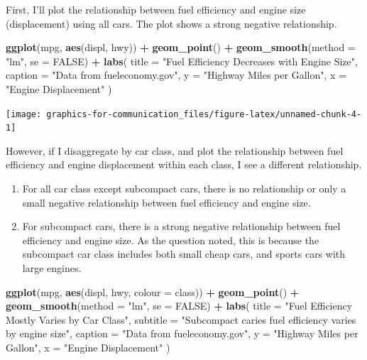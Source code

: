 \documentclass[]{book}
\newenvironment{Shaded}{\begin{snugshade}}{\end{snugshade}}
\newcommand{\DataTypeTok}[1]{\textcolor[rgb]{0.13,0.29,0.53}{#1}}
\newcommand{\KeywordTok}[1]{\textcolor[rgb]{0.13,0.29,0.53}{\textbf{#1}}}
\newcommand{\NormalTok}[1]{#1}
\newcommand{\OperatorTok}[1]{\textcolor[rgb]{0.81,0.36,0.00}{\textbf{#1}}}
\newcommand{\OtherTok}[1]{\textcolor[rgb]{0.56,0.35,0.01}{#1}}
\newcommand{\StringTok}[1]{\textcolor[rgb]{0.31,0.60,0.02}{#1}}
\theoremstyle{plain}
\theoremstyle{remark}
\begin{document}
First, I'll plot the relationship between fuel efficiency and engine size (displacement) using all cars.
The plot shows a strong negative relationship.

\begin{Shaded}
\begin{Highlighting}[]
\KeywordTok{ggplot}\NormalTok{(mpg, }\KeywordTok{aes}\NormalTok{(displ, hwy)) }\OperatorTok{+}
\StringTok{  }\KeywordTok{geom_point}\NormalTok{() }\OperatorTok{+}
\StringTok{  }\KeywordTok{geom_smooth}\NormalTok{(}\DataTypeTok{method =} \StringTok{"lm"}\NormalTok{, }\DataTypeTok{se =} \OtherTok{FALSE}\NormalTok{) }\OperatorTok{+}
\StringTok{  }\KeywordTok{labs}\NormalTok{(}
    \DataTypeTok{title =} \StringTok{"Fuel Efficiency Decreases with Engine Size"}\NormalTok{,}
    \DataTypeTok{caption =} \StringTok{"Data from fueleconomy.gov"}\NormalTok{,}
    \DataTypeTok{y =} \StringTok{"Highway Miles per Gallon"}\NormalTok{,}
    \DataTypeTok{x =} \StringTok{"Engine Displacement"}
\NormalTok{  )}
\end{Highlighting}
\end{Shaded}

\begin{center}\texttt{[image: graphics-for-communication\_files/figure-latex/unnamed-chunk-4-1]} \end{center}

However, if I disaggregate by car class, and plot the relationship between
fuel efficiency and engine displacement within each class, I see a different
relationship.

\begin{enumerate}
\def\labelenumi{\arabic{enumi}.}
\item
  For all car class except subcompact cars, there is no relationship or only
  a small negative relationship between fuel efficiency and engine size.
\item
  For subcompact cars, there is a strong negative relationship between fuel
  efficiency and engine size. As the question noted, this is because the
  subcompact car class includes both small cheap cars, and sports cars with
  large engines.
\end{enumerate}

\begin{Shaded}
\begin{Highlighting}[]
\KeywordTok{ggplot}\NormalTok{(mpg, }\KeywordTok{aes}\NormalTok{(displ, hwy, }\DataTypeTok{colour =}\NormalTok{ class)) }\OperatorTok{+}
\StringTok{  }\KeywordTok{geom_point}\NormalTok{() }\OperatorTok{+}
\StringTok{  }\KeywordTok{geom_smooth}\NormalTok{(}\DataTypeTok{method =} \StringTok{"lm"}\NormalTok{, }\DataTypeTok{se =} \OtherTok{FALSE}\NormalTok{) }\OperatorTok{+}
\StringTok{  }\KeywordTok{labs}\NormalTok{(}
    \DataTypeTok{title =} \StringTok{"Fuel Efficiency Mostly Varies by Car Class"}\NormalTok{,}
    \DataTypeTok{subtitle =} \StringTok{"Subcompact caries fuel efficiency varies by engine size"}\NormalTok{,}
    \DataTypeTok{caption =} \StringTok{"Data from fueleconomy.gov"}\NormalTok{,}
    \DataTypeTok{y =} \StringTok{"Highway Miles per Gallon"}\NormalTok{,}
    \DataTypeTok{x =} \StringTok{"Engine Displacement"}
\NormalTok{  )}
\end{Highlighting}
\end{Shaded}
\end{document}
